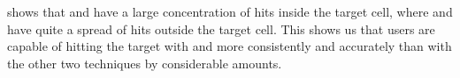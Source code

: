  shows that \swipe and \throw have a large concentration of hits inside the target cell, where \pinch and \tilt have quite a spread of hits outside the target cell. 
This shows us that users are capable of hitting the target with \swipe and \throw more consistently and accurately than with the other two techniques by considerable amounts.


\begin{figure}[H]
	\centering
	 \\ 

\end{figure}
